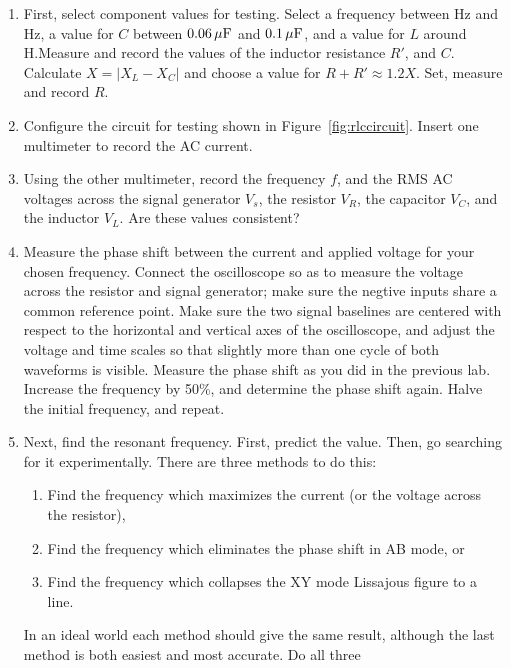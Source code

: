 \documentclass[12pt]{article}
\begin{document}
\begin{enumerate}
\item First, select component values for testing.  Select a frequency
  between \unit[300]{Hz} and \unit[600]{Hz}, a value for $C$ between
  $\unit[0.06]{\mu F}$ and $\unit[0.1]{\mu F}$, and a value for $L$
  around \unit[7]{H}.Measure and record the values of the inductor
  resistance $R'$, and $C$.  Calculate $X = \left| X_L-X_C \right|$
  and choose a value for $R + R' \approx 1.2 X$.  Set, measure and
  record $R$.
\item Configure the circuit for testing shown in
  Figure~\ref{fig:rlccircuit}.  Insert one multimeter to record the AC
  current.
\item Using the other multimeter, record the frequency $f$, and the
  RMS AC voltages across the signal generator $V_s$, the resistor
  $V_R$, the capacitor $V_C$, and the inductor $V_L$.  Are these
  values consistent?
\item \label{item:phase} Measure the phase shift between the current
  and applied voltage for your chosen frequency.  Connect the
  oscilloscope so as to measure the voltage across the resistor and
  signal generator; make sure the negtive inputs share a common
  reference point.  Make sure the two signal baselines are centered
  with respect to the horizontal and vertical axes of the
  oscilloscope, and adjust the voltage and time scales so that
  slightly more than one cycle of both waveforms is visible.  Measure
  the phase shift as you did in the previous lab.  Increase the
  frequency by 50\%, and determine the phase shift again.  Halve the
  initial frequency, and repeat.
\item \label{item:phase_resonance} Next, find the resonant frequency.
  First, predict the value.  Then, go searching for it experimentally.
  There are three methods to do this:
  \begin{enumerate}
  \item Find the frequency which maximizes the current (or the voltage
    across the resistor), 
  \item Find the frequency which eliminates the phase shift in AB
    mode, or
  \item Find the frequency which collapses the XY mode Lissajous
    figure to a line.
  \end{enumerate}
  In an ideal world each method should give the same result, although
  the last method is both easiest and most accurate.  Do all three

\end{enumerate}
\end{document}
